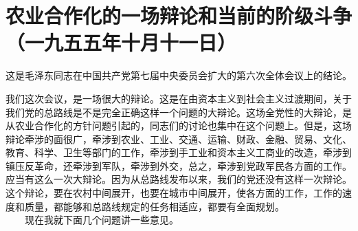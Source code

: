 \documentclass[cn,11pt,chinese]{elegantbook}
\def\myformat#1{\hfil\hfil #1}
\begin{document}
\section*{\myformat{农业合作化的一场辩论和当前的阶级斗争}\\\myformat{（一九五五年十月十一日）}}
\begin{introduction}
\item 这是毛泽东同志在中国共产党第七届中央委员会扩大的第六次全体会议上的结论。
\end{introduction}
我们这次会议，是一场很大的辩论。这是在由资本主义到社会主义过渡期间，关于我们党的总路线是不是完全正确这样一个问题的大辩论。这场全党性的大辩论，是从农业合作化的方针问题引起的，同志们的讨论也集中在这个问题上。但是，这场辩论牵涉的面很广，牵涉到农业、工业、交通、运输、财政、金融、贸易、文化、教育、科学、卫生等部门的工作，牵涉到手工业和资本主义工商业的改造，牵涉到镇压反革命，还牵涉到军队，牵涉到外交，总之，牵涉到党政军民各方面的工作。应当有这么一次大辩论。因为从总路线发布以来，我们的党还没有这样一次辩论。这个辩论，要在农村中间展开，也要在城市中间展开，使各方面的工作，工作的速度和质量，都能够和总路线规定的任务相适应，都要有全面规划。\\
　　现在我就下面几个问题讲一些意见。\\
\end{document}
